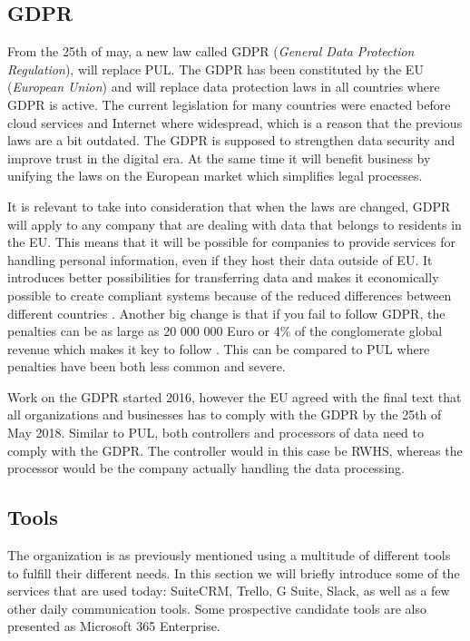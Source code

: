 \subsection{GDPR}
\label{sec:gdpr}
From the 25th of may, a new law called GDPR (\textit{General Data Protection Regulation}), will replace PUL. The GDPR has been constituted by the EU (\textit{European Union}) and will replace data protection laws in all countries where GDPR is active. The current legislation for many countries  were enacted before cloud services and Internet where widespread, which is a reason that the previous laws are a bit outdated. The GDPR is supposed to strengthen data security and improve trust in the digital era. At the same time it will benefit business by unifying the laws on the European market which simplifies legal processes.

It is relevant to take into consideration that when the laws are changed, GDPR will apply to any company that are dealing with data that belongs to residents in the EU. This means that it will be possible for companies to provide services for handling personal information, even if they host their data outside of EU. It introduces better possibilities for transferring data and makes it economically possible to create compliant systems because of the reduced differences between different countries \cite{Google}. Another big change is that if you fail to follow GDPR, the penalties can be as large as 20 000 000 Euro or 4\% of the conglomerate global revenue which makes it key to follow \cite{MULTISOFT}. This can be compared to PUL where penalties have been both less common and severe.

Work on the GDPR started 2016, however the EU agreed with the final text that all organizations and businesses has to comply with the GDPR by the 25th of May 2018. Similar to PUL, both controllers and processors of data need to comply with the GDPR. The controller would in this case be RWHS, whereas the processor would be the company actually handling the data processing. \cite{EuropeanComission2016}

\subsection{Tools}
\label{sec:current-tools}
The organization is as previously mentioned using a multitude of different tools to fulfill their different needs. In this section we will briefly introduce some of the services that are used today: SuiteCRM, Trello, G Suite, Slack, as well as a few other daily communication tools. Some prospective candidate tools are also presented as Microsoft 365 Enterprise.


